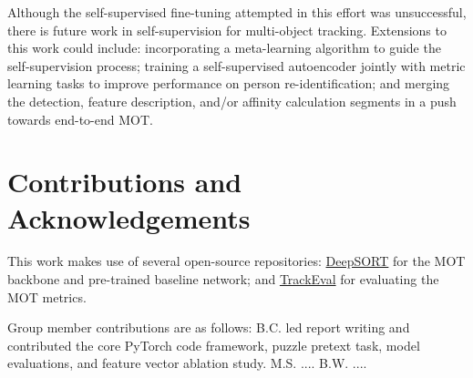 \documentclass[10pt,twocolumn,letterpaper]{article}
\begin{document}
Although the self-supervised fine-tuning attempted in this effort was unsuccessful, there is future work in self-supervision for multi-object tracking. Extensions to this work could include: incorporating a meta-learning algorithm to guide the self-supervision process; training a self-supervised autoencoder jointly with metric learning tasks to improve performance on person re-identification; and merging the detection, feature description, and/or affinity calculation segments in a push towards end-to-end MOT.


\section{Contributions and Acknowledgements}
This work makes use of several open-source repositories: \href{https://github.com/nwojke/deep_sort}{DeepSORT} for the MOT backbone and pre-trained baseline network; and \href{https://github.com/JonathonLuiten/TrackEval}{TrackEval} for evaluating the MOT metrics.

Group member contributions are as follows: B.C. led report writing and contributed the core PyTorch code framework, puzzle pretext task, model evaluations, and feature vector ablation study. M.S. .... B.W. ....



{\small


}
\end{document}
